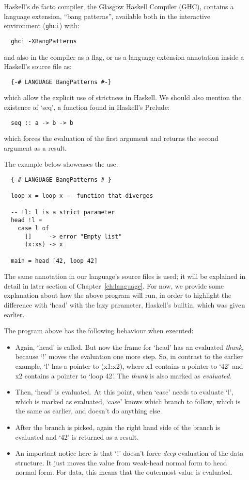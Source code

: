 \documentclass[diploma]{softlab-thesis}
\begin{document}
Haskell's de facto compiler, the Glasgow Haskell Compiler (GHC),
contains a language extension, ``bang patterns'', available both in
the interactive environment (\texttt{ghci}) with:
\begin{verbatim}
  ghci -XBangPatterns
\end{verbatim}
and also in the compiler as a flag, or as a language extension annotation inside a Haskell's source file as:
\begin{verbatim}
  {-# LANGUAGE BangPatterns #-}
\end{verbatim}
which allow the explicit use of strictness in Haskell. We should also mention the existence of `seq', a function found
in Haskell's Prelude:
\begin{verbatim}
  seq :: a -> b -> b
\end{verbatim}
which forces the evaluation of the first argument and returns the second argument as a result.

The example below showcases the use:
\begin{verbatim}
  {-# LANGUAGE BangPatterns #-}

  loop x = loop x -- function that diverges

  -- !l: l is a strict parameter
  head !l = 
    case l of 
      []     -> error "Empty list"
      (x:xs) -> x

  main = head [42, loop 42]
\end{verbatim}

The same annotation in our language's source files is used; it will be explained in detail in later section of 
Chapter~\ref{ch:language}. For now, we provide some explanation about how the above program will run, in order to highlight 
the difference with `head' with the lazy parameter, Haskell's builtin, which was given earlier. 

The program above has the following behaviour when executed:
\begin{itemize}
  \item Again, `head' is called. But now the frame for `head' has an evaluated \textit{thunk}, because `!' moves the 
  evaluation one more step. So, in contrast to the earlier example, `l' has a pointer to (x1:x2), where x1 contains a pointer to 
  `42' and x2 contains a pointer to `loop 42'. The \textit{thunk} is also marked as \textit{evaluated}.
  \item Then, `head' is evaluated. At this point, when `case' needs to evaluate `l', which is marked as evaluated, `case' knows 
  which branch to follow, which is the same as earlier, and doesn't do anything else.
  \item After the branch is picked, again the right hand side of the branch is evaluated and `42' is returned as a result.
  \item An important notice here is that `!' doesn't force \textit{deep} evaluation of the data structure. It just moves the 
  value from weak-head normal form to head normal form. For data, this means that the outermost value is evaluated.
\end{itemize}
\end{document}
